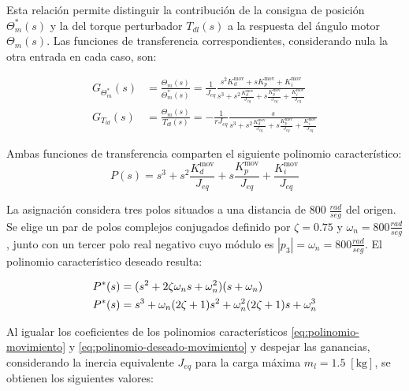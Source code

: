 \documentclass[blue,fullpaper]{ludusofficial}  %
\begin{document}
Esta relación permite distinguir la contribución de la consigna de posición $\Theta_{m}^{*}(s)$ y la del torque perturbador $T_{dl}(s)$ a la respuesta del ángulo motor $\Theta_{m}(s)$. Las funciones de transferencia correspondientes, considerando nula la otra entrada en cada caso, son:

\begin{align}
G_{\Theta^{*}_{m}}(s) & = \frac{\Theta_{m}(s)}{\Theta^{*}_{m}(s) }  = \frac{1}{J_{eq}} \frac{  s^{2}K_{d}^{\text{mov}} + sK_{p}^{\text{mov}} + K_{i}^{\text{mov}} }{ s^{3}+ s^{2}\frac{K_{d}^{\text{mov}}}{J_{eq}} + s\frac{K_{p}^{\text{mov}}}{J_{eq}}  + \frac{K_{i}^{\text{mov}}}{J_{eq}} }
\label{eq:transferencia-posicion-lc} \\
G_{T_{ld}}(s) & = \frac{\Theta_{m}(s)}{T_{dl}(s) } =  - \frac{1}{rJ_{eq}} \frac{s}{ s^{3}+ s^{2}\frac{K_{d}^{\text{mov}}}{J_{eq}} + s\frac{K_{p}^{\text{mov}}}{J_{eq}}  + \frac{K_{i}^{\text{mov}}}{J_{eq}} }
\label{eq:transferencia-perturbacion-lc}
\end{align}

Ambas funciones de transferencia comparten el siguiente polinomio característico:
\begin{equation}
\label{eq:polinomio-movimiento}
P(s) = s^{3}+ s^{2}\frac{K_{d}^{\text{mov}}}{J_{eq}} + s\frac{K_{p}^{\text{mov}}}{J_{eq}}  + \frac{K_{i}^{\text{mov}}}{J_{eq}}
\end{equation}

La asignación considera tres polos situados a una distancia de $800\;\frac{rad}{seg}$ del origen. Se elige un par de polos complejos conjugados definido por $\zeta=0.75$ y $\omega_{n}=800 \frac{rad}{seg}$, junto con un tercer polo real negativo cuyo módulo es $|p_{3}|=\omega_{n}=800 \frac{rad}{seg}$. El polinomio característico deseado resulta:

\begin{align}
P^{*}(s)  & = (s^{2}+2\zeta \omega_{n}s+\omega_{n}^{2})(s+\omega_{n})
\notag \\
P^{*}(s)  & = s^{3} + \omega_{n} (2\zeta+1) s^{2} + \omega_{n}^{2} (2\zeta+1)s + \omega_{n}^{3}
\label{eq:polinomio-deseado-movimiento}
\end{align}

Al igualar los coeficientes de los polinomios característicos \eqref{eq:polinomio-movimiento} y \eqref{eq:polinomio-deseado-movimiento} y despejar las ganancias, %
considerando la inercia equivalente $J_{eq}$ para la carga máxima $m_{l} =1.5\;[\text{kg}]$, se obtienen los siguientes valores:
\end{document}
